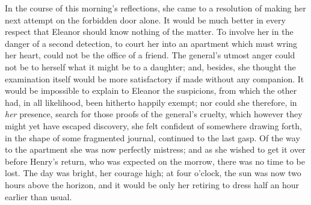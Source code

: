 In the course of this morning's reflections, she came to a resolution of making her next attempt on the forbidden door alone. It would be much better in every respect that Eleanor should know nothing of the matter. To involve her in the danger of a second detection, to court her into an apartment which must wring her heart, could not be the office of a friend. The general's utmost anger could not be to herself what it might be to a daughter; and, besides, she thought the examination itself would be more satisfactory if made without any companion. It would be impossible to explain to Eleanor the suspicions, from which the other had, in all likelihood, been hitherto happily exempt; nor could she therefore, in {\em her} presence, search for those proofs of the general's cruelty, which however they might yet have escaped discovery, she felt confident of somewhere drawing forth, in the shape of some fragmented journal, continued to the last gasp. Of the way to the apartment she was now perfectly mistress; and as she wished to get it over before Henry's return, who was expected on the morrow, there was no time to be lost. The day was bright, her courage high; at four o'clock, the sun was now two hours above the horizon, and it would be only her retiring to dress half an hour earlier than usual.

